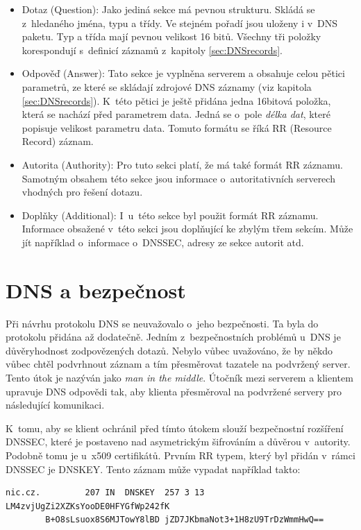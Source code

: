 \documentclass[thesis=M,czech]{src/FITthesis}[2019/12/23]
\begin{document}
\begin{itemize}
	\item Dotaz (Question): Jako jediná sekce má pevnou strukturu. Skládá se z~hledaného jména, typu a třídy. Ve stejném pořadí jsou uloženy i v~DNS paketu. Typ a třída mají pevnou velikost 16 bitů. Všechny tři položky korespondují s~definicí záznamů z~kapitoly \ref{sec:DNSrecords}. 
	\item Odpověď (Answer): Tato sekce je vyplněna serverem a obsahuje celou pětici parametrů, ze které se skládají zdrojové DNS záznamy (viz kapitola \ref{sec:DNSrecords}).  K~této pětici je ještě přidána jedna 16bitová položka, která se nachází před parametrem data. Jedná se o~pole \textit{délka dat}, které popisuje velikost parametru data. Tomuto formátu se říká RR (Resource Record) záznam.
	\item Autorita (Authority): Pro tuto sekci platí, že má také formát RR \linebreak záznamu. Samotným obsahem této sekce jsou informace o~autoritativních serverech vhodných pro řešení dotazu. 
	\item Doplňky (Additional): I~u~této sekce byl použit formát RR záznamu. Informace obsažené v~této sekci jsou doplňující ke zbylým třem sekcím. Může jít například  o~informace o~DNSSEC, adresy ze sekce autorit atd.
\end{itemize}
\cite{RFC1035}
\section{DNS a bezpečnost}
\label{sec:DNSSecurity}
Při návrhu protokolu DNS se neuvažovalo o~jeho bezpečnosti. Ta byla do protokolu přidána až dodatečně. Jedním z~bezpečnostních problémů u~DNS je důvěryhodnost zodpovězených dotazů. Nebylo vůbec uvažováno, že by někdo vůbec chtěl podvrhnout záznam a tím přesměrovat tazatele na podvržený server.  Tento útok je nazýván jako \textit{man in the middle}. Útočník mezi serverem a klientem upravuje DNS odpovědi tak, aby klienta přesměroval na podvržené servery pro následující komunikaci. 

K~tomu, aby se  klient ochránil před tímto útokem slouží bezpečnostní rozšíření DNSSEC, které je postaveno nad asymetrickým šifrováním a důvěrou v~autority. Podobně tomu je u~x509 certifikátů. Prvním RR typem, který byl přidán v~rámci DNSSEC je DNSKEY. Tento záznam může vypadat například takto: 

\begin{verbatim}
nic.cz.			207	IN	DNSKEY	257 3 13 LM4zvjUgZi2XZKsYooDE0HFYGfWp242fK
        B+O8sLsuox8S6MJTowY8lBD jZD7JKbmaNot3+1H8zU9TrDzWmmHwQ==
\end{verbatim}
\end{document}
